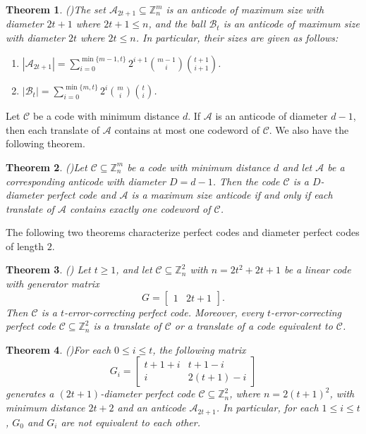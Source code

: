 \documentclass{article}
\newtheorem{theorem}{Theorem}[section]
\theoremstyle{definition}
\begin{document}
\begin{theorem}{\rm(\cite{E22})}\label{anticodesize}
The set $\mathcal{A}_{2t+1}\subseteq\mathbb{Z}_n^m$ is an anticode of maximum size with diameter $2t+1$ where $2t+1\le n$, and the ball $\mathcal{B}_t$ is an anticode of maximum size with diameter $2t$ where $2t\le n$. In particular, their sizes are given as follows:
\begin{enumerate}
\item[(i)] $\displaystyle |\mathcal{A}_{2t+1}|=\sum_{i=0}^{\min\{m-1, t\}}2^{i+1}{\binom{m-1}{i}}{\binom{t+1}{i+1}}$.
\item[(ii)] $\displaystyle |\mathcal{B}_t|=\sum_{i=0}^{\min\{m, t\}}2^{i}{\binom{m}{i}}{\binom{t}{i}}$.
\end{enumerate}
\end{theorem}

Let $\mathcal{C}$ be a code with minimum distance $d$. If $\mathcal{A}$ is an anticode of diameter $d-1$, then each translate of $\mathcal{A}$ contains at most one codeword of $\mathcal{C}$. We also have the following theorem.
\begin{theorem}{\rm(\cite{E22})}\label{dperfectcode}
Let $\mathcal{C}\subseteq\mathbb{Z}_n^m$ be a code with minimum distance $d$ and let $\mathcal{A}$ be a corresponding anticode with diameter $D=d-1$. Then the code $\mathcal{C}$ is a $D$-diameter perfect code and $\mathcal{A}$ is a maximum size anticode if and only if each translate of $\mathcal{A}$ contains exactly one codeword of $\mathcal{C}$.
\end{theorem}

The following two theorems characterize perfect codes and diameter perfect codes of length $2$.


\begin{theorem}\label{pcode}{\rm(\cite{GW70})}
Let $t\ge 1$, and let $\mathcal{C}\subseteq\mathbb{Z}_n^2$ with $n=2t^2+2t+1$ be a linear code with generator matrix
\[
G=\begin{bmatrix} 1 & 2t+1\end{bmatrix}.
\]
Then $\mathcal{C}$ is a $t$-error-correcting perfect code. Moreover, every $t$-error-correcting perfect code $\mathcal{C}\subseteq\mathbb{Z}_n^2$ is a translate of $\mathcal{C}$ or a translate of a code equivalent to $\mathcal{C}$.
\end{theorem}

\begin{theorem}{\rm{(\cite{E22})}}\label{leeanticode}
For each $0\le i\le t$, the following matrix
\[
G_i=\begin{bmatrix}
    t+1+i & t+1-i\\i & 2(t+1)-i
\end{bmatrix}
\]
generates a $(2t+1)$-diameter perfect code $\mathcal{C}\subseteq\mathbb{Z}_n^2$, where $n=2(t+1)^2$, with minimum distance $2t+2$ and an anticode $\mathcal{A}_{2t+1}$. In particular, for each $1\le i\le t$, $G_0$ and $G_i$ are not equivalent to each other.
\end{theorem}
\end{document}
